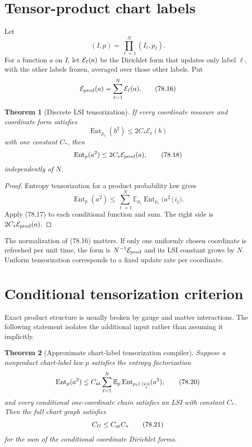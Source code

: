 \documentclass[11pt]{article}
\newtheorem{theorem}{Theorem}[section]
\theoremstyle{remark}
\begin{document}
\section{Tensor-product chart labels}

Let
\[
 (I,p)=\prod_{\ell=1}^{N}(I_\ell,p_\ell).             \tag{78.15}
\]
For a function \(a\) on \(I\), let
\({\cal E}_\ell(a)\) be the Dirichlet form that updates only label
\(\ell\), with the other labels frozen, averaged over those other
labels.  Put
\[
 {\cal E}_{\rm prod}(a)=\sum_{\ell=1}^N{\cal E}_\ell(a).
                                                               \tag{78.16}
\]

\begin{theorem}[Discrete LSI tensorization]
\label{thm:v15v78-tensor}
If every coordinate measure and coordinate form satisfies
\[
 \operatorname{Ent}_{p_\ell}(b^2)
 \leq2C_*\mathcal E_\ell(b)                           \tag{78.17}
\]
with one constant \(C_*\), then
\[
 \operatorname{Ent}_{p}(a^2)
 \leq2C_*{\cal E}_{\rm prod}(a),                      \tag{78.18}
\]
independently of \(N\).
\end{theorem}

\begin{proof}
Entropy tensorization for a product probability law gives
\[
 \operatorname{Ent}_p(a^2)
 \leq
 \sum_{\ell=1}^N
 \mathbb E_{p_{\widehat\ell}}
 \operatorname{Ent}_{p_\ell}
 \bigl(a^2\,|\,i_{\widehat\ell}\bigr).                \tag{78.19}
\]
Apply (78.17) to each conditional function and sum.  The right side
is \(2C_*{\cal E}_{\rm prod}(a)\).
\end{proof}

The normalization of (78.16) matters.  If only one uniformly
chosen coordinate is refreshed per unit time, the form is
\(N^{-1}{\cal E}_{\rm prod}\) and its LSI constant grows by \(N\).
Uniform tensorization corresponds to a fixed update rate per
coordinate.

\section{Conditional tensorization criterion}

Exact product structure is usually broken by gauge and matter
interactions.  The following statement isolates the additional
input rather than assuming it implicitly.

\begin{theorem}[Approximate chart-label tensorization compiler]
\label{thm:v15v78-approx}
Suppose a nonproduct chart-label law \(p\) satisfies the entropy
factorization
\[
 \operatorname{Ent}_{p}(a^2)
 \leq
 C_{\rm at}
 \sum_{\ell=1}^N
 \mathbb E_p
 \operatorname{Ent}_{p_\ell(\cdot|i_{\widehat\ell})}
 (a^2),                                               \tag{78.20}
\]
and every conditional one-coordinate chain satisfies an LSI with
constant \(C_*\).  Then the full chart graph satisfies
\[
 C_G\leq C_{\rm at}C_*                                \tag{78.21}
\]
for the sum of the conditional coordinate Dirichlet forms.
\end{theorem}
\end{document}
